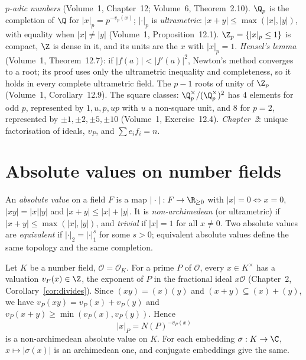 \begin{reminder}
\emph{$p$-adic numbers} (Volume~1, Chapter~12; Volume~6, Theorem~2.10). $\Q_p$ is the completion of $\Q$ for
$|x|_p=p^{-v_p(x)}$; $|\cdot|_p$ is \emph{ultrametric}: $|x+y|\le\max(|x|,|y|)$, with equality when $|x|\ne|y|$
(Volume~1, Proposition~12.1). $\Z_p=\{|x|_p\le1\}$ is compact, $\Z$ is dense in it, and its units are the $x$ with $|x|_p=1$.
\emph{Hensel's lemma} (Volume~1, Theorem~12.7): if $|f(a)|<|f'(a)|^2$, Newton's method converges to a root; its proof uses only
the ultrametric inequality and completeness, so it holds in every complete ultrametric field. The $p-1$ roots of unity of
$\Z_p$ (Volume~1, Corollary~12.9). The square classes: $\Q_p^\times/(\Q_p^\times)^2$ has $4$ elements for odd $p$, represented by
$1,u,p,up$ with $u$ a non-square unit, and $8$ for $p=2$, represented by $\pm1,\pm2,\pm5,\pm10$ (Volume~1, Exercise~12.4).
\emph{Chapter~2}: unique factorisation of ideals, $v_P$, and $\sum e_if_i=n$.
\end{reminder}

\section{Absolute values on number fields}

An \emph{absolute value} on a field $F$ is a map $|\cdot|:F\to\R_{\ge0}$ with $|x|=0\iff x=0$, $|xy|=|x||y|$ and
$|x+y|\le|x|+|y|$. It is \emph{non-archimedean} (or ultrametric) if $|x+y|\le\max(|x|,|y|)$, and \emph{trivial} if $|x|=1$
for all $x\ne0$. Two absolute values are \emph{equivalent} if $|\cdot|_2=|\cdot|_1^s$ for some $s>0$; equivalent absolute values
define the same topology and the same completion.

Let $K$ be a number field, $\mathcal O=\mathcal O_K$. For a prime $P$ of $\mathcal O$, every $x\in K^\times$ has a valuation
$v_P(x)\in\Z$, the exponent of $P$ in the fractional ideal $x\mathcal O$ (Chapter~2, Corollary~\ref{cor:divides}). Since
$(xy)=(x)(y)$ and $(x+y)\subseteq(x)+(y)$, we have $v_P(xy)=v_P(x)+v_P(y)$ and $v_P(x+y)\ge\min(v_P(x),v_P(y))$. Hence
\[
|x|_P=N(P)^{-v_P(x)}
\]
is a non-archimedean absolute value on $K$. For each embedding $\sigma:K\to\C$, $x\mapsto|\sigma(x)|$ is an archimedean one,
and conjugate embeddings give the same.

